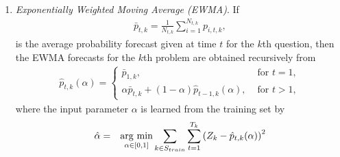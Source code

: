 \documentclass[aoas, preprint]{imsart}
\newcommand{\argmin}{\operatornamewithlimits{arg\ min}}
\numberwithin{equation}{section}
\theoremstyle{plain}
\begin{document}
\begin{enumerate}
\begin{enumerate}
\item \textit{Exponentially Weighted Moving Average (EWMA)}. If 
\begin{eqnarray*}
\bar{p}_{t,k}  = \frac{1}{N_{t,k}} \sum_{i=1}^{N_{t,k}} p_{i,t,k},
\end{eqnarray*}
is the average probability forecast given at time $t$ for the $k$th question, then the EWMA forecasts for the $k$th problem are obtained recursively from
\begin{eqnarray*}
\hat{p}_{t,k}(\alpha) =
\begin{cases}
 \bar{p}_{1,k}, & \text{ for } t  = 1, \\
\alpha \bar{p}_{t,k}  + (1-\alpha) \hat{p}_{t-1,k}(\alpha), & \text{ for } t > 1,
\end{cases}
\end{eqnarray*}
where the input parameter $\alpha$ is learned from the training set by 
\begin{eqnarray*}
\hat{\alpha} &=& \argmin_{\alpha \in [0,1]} \sum_{k \in S_{train}} \sum_{t=1}^{T_k} \left(Z_k - \hat{p}_{t,k}(\alpha) \right)^2
\end{eqnarray*}
 

\end{enumerate}
\end{enumerate}
\end{document}
